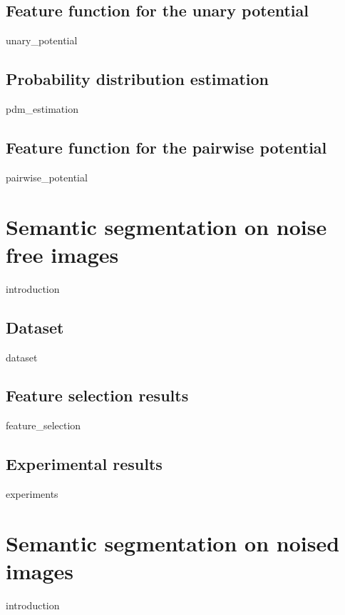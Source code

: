 \documentclass[12pt]{report}
\begin{document}
        \subsection{Feature function for the unary potential}
        \label{sec:nonlinear_unary_potential}
        {unary_potential}
        
        \subsection{Probability distribution estimation}
        {pdm_estimation}
        
        \subsection{Feature function for the pairwise potential}
        {pairwise_potential}
        
    \section{Semantic segmentation on noise free images}
    {introduction} 
        
        \subsection{Dataset}
        {dataset}
     
        \subsection{Feature selection results}
        \label{sec:feature_selection_noise_free}
        {feature_selection}
        
        \subsection{Experimental results}	
            {experiments}
    
    \section{Semantic segmentation on noised images}
    {introduction} 
\end{document}
